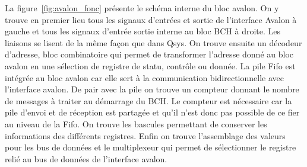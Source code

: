 \documentclass[a4paper, 11pt, svgnames]{report}
\begin{document}
            La figure~\ref{fig:avalon_fonc} présente le schéma interne du bloc
            avalon. On y trouve en premier lieu tous les signaux d'entrées et
            sortie de l'interface Avalon à gauche et tous les signaux d'entrée
            sortie interne au bloc BCH à droite. Les liaisons se lisent de la
            même façon que dans Qsys. On trouve ensuite un décodeur d'adresse,
            bloc combinatoire qui permet de transformer l'adresse donné au
            bloc avalon en une sélection de registre de statu, contrôle ou
            donnée. La pile Fifo est intégrée au bloc avalon car elle sert à
            la communication bidirectionnelle avec l'interface avalon. De pair
            avec la pile on trouve un compteur donnant le nombre de messages à
            traiter au démarrage du BCH. Le compteur est nécessaire car la pile
            d'envoi et de réception est partagée et qu'il n'est donc pas
            possible de ce fier au niveau de la Fifo. On trouve les bascules
            permettant de conserver les informations des différents registres.
            Enfin on trouve l'assemblage des valeurs pour les bus de données et
            le multiplexeur qui permet de sélectionner le registre relié au bus de
            données de l'interface avalon.
\end{document}
